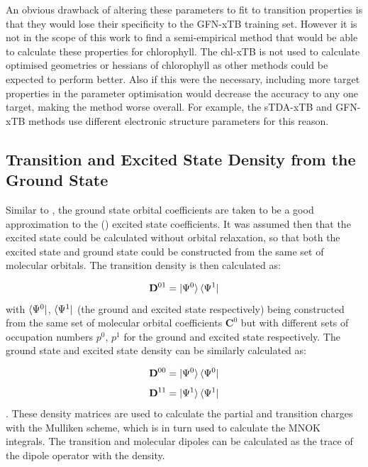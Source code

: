 An obvious drawback of altering these parameters to fit to transition properties
is that they would lose their specificity to the GFN-xTB training set. However
it is not in the scope of this work to find a semi-empirical method that would be able
to calculate these properties for chlorophyll. The chl-xTB is not used to calculate
optimised geometries or hessians of chlorophyll as other methods could be expected 
to perform better. Also if this were the necessary, including more target properties
in the parameter optimisation would decrease the accuracy to any one target, making
the method worse overall. For example, the sTDA-xTB and GFN-xTB methods use different
electronic structure parameters for this reason.

\subsection{Transition and Excited State Density from the Ground State}

Similar to \dscf, the ground state orbital coefficients are taken to be a good
approximation to the (\Qy) excited state coefficients. It was assumed then that
the excited state could be calculated without orbital relaxation, so that both the
excited state and ground state could be constructed from the same set of molecular
orbitals. The transition density is then calculated as:

\begin{equation}
\mathbf{D}^{01} = \ket{\Psi^0} \bra{\Psi^1} 
\end{equation}
%
with $\bra{\Psi^0}$, $\bra{\Psi^1}$ (the ground and excited state respectively)
being constructed from the same set of molecular orbital coefficients $\mathbf{C}^0$
but with different sets of occupation numbers $p^0$, $p^1$ for the ground and
excited state respectively. The ground state and excited state density can be
similarly calculated as:

\begin{equation}
\mathbf{D}^{00} = \ket{\Psi^0} \bra{\Psi^0}  
\end{equation}
%
\begin{equation}
\mathbf{D}^{11} = \ket{\Psi^1} \bra{\Psi^1}  
\end{equation}
%
. These density matrices are used to calculate the partial and transition charges
with the Mulliken scheme, which is in turn used to calculate the MNOK integrals.
The transition and molecular dipoles can be calculated as the trace of the dipole
operator with the density.

